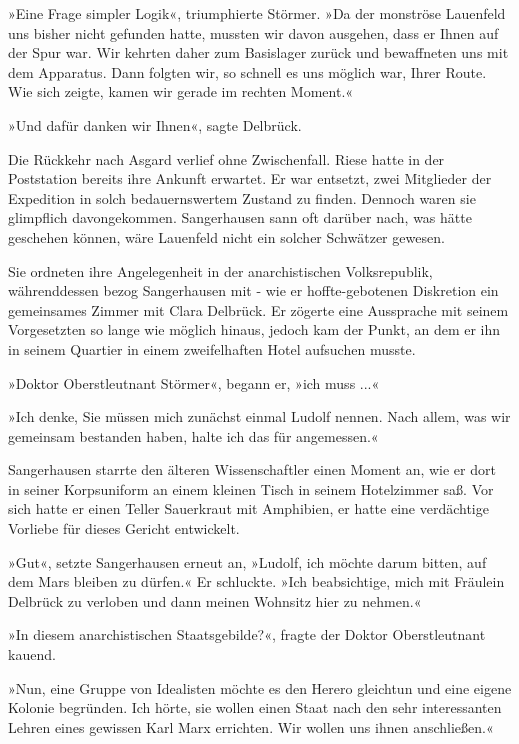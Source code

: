 »Eine Frage simpler Logik«, triumphierte Störmer. »Da der monströse
Lauenfeld uns bisher nicht gefunden hatte, mussten wir davon
ausgehen, dass er Ihnen auf der Spur war. Wir kehrten daher zum
Basislager zurück und bewaffneten uns mit dem Apparatus. Dann
folgten wir, so schnell es uns möglich war, Ihrer Route. Wie sich
zeigte, kamen wir gerade im rechten Moment.«

»Und dafür danken wir Ihnen«, sagte Delbrück.

\bigpar

Die Rückkehr nach Asgard verlief ohne Zwischenfall. Riese hatte in
der Poststation bereits ihre Ankunft erwartet. Er war entsetzt,
zwei Mitglieder der Expedition in solch bedauernswertem Zustand zu
finden. Dennoch waren sie glimpflich davongekommen. Sangerhausen
sann oft darüber nach, was hätte geschehen können, wäre Lauenfeld
nicht ein solcher Schwätzer gewesen.

Sie ordneten ihre Angelegenheit in der anarchistischen
Volksrepublik, währenddessen bezog Sangerhausen mit - wie er
hoffte\bigpar-\bigparder gebotenen Diskretion ein gemeinsames Zimmer mit Clara
Delbrück. Er zögerte eine Aussprache mit seinem Vorgesetzten so
lange wie möglich hinaus, jedoch kam der Punkt, an dem er ihn in
seinem Quartier in einem zweifelhaften Hotel aufsuchen musste.

»Doktor Oberstleutnant Störmer«, begann er, »ich muss ...«

»Ich denke, Sie müssen mich zunächst einmal Ludolf nennen. Nach
allem, was wir gemeinsam bestanden haben, halte ich das für
angemessen.«

Sangerhausen starrte den älteren Wissenschaftler einen Moment an,
wie er dort in seiner Korpsuniform an einem kleinen Tisch in seinem
Hotelzimmer saß. Vor sich hatte er einen Teller Sauerkraut mit
Amphibien, er hatte eine verdächtige Vorliebe für dieses Gericht
entwickelt.

»Gut«, setzte Sangerhausen erneut an, »Ludolf, ich möchte darum
bitten, auf dem Mars bleiben zu dürfen.« Er schluckte. »Ich
beabsichtige, mich mit Fräulein Delbrück zu verloben und dann
meinen Wohnsitz hier zu nehmen.«

»In diesem anarchistischen Staatsgebilde?«, fragte der Doktor
Oberstleutnant kauend.

»Nun, eine Gruppe von Idealisten möchte es den Herero gleichtun und
eine eigene Kolonie begründen. Ich hörte, sie wollen einen Staat
nach den sehr interessanten Lehren eines gewissen Karl Marx
errichten. Wir wollen uns ihnen anschließen.«

